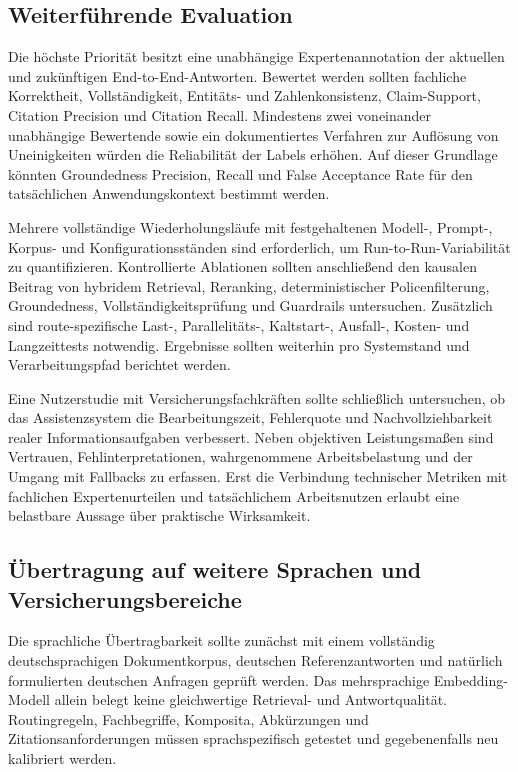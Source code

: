 \subsection{Weiterführende Evaluation}

Die höchste Priorität besitzt eine unabhängige Expertenannotation der aktuellen und zukünftigen End-to-End-Antworten. Bewertet werden sollten fachliche Korrektheit, Vollständigkeit, Entitäts- und Zahlenkonsistenz, Claim-Support, Citation Precision und Citation Recall. Mindestens zwei voneinander unabhängige Bewertende sowie ein dokumentiertes Verfahren zur Auflösung von Uneinigkeiten würden die Reliabilität der Labels erhöhen. Auf dieser Grundlage könnten Groundedness Precision, Recall und False Acceptance Rate für den tatsächlichen Anwendungskontext bestimmt werden.

Mehrere vollständige Wiederholungsläufe mit festgehaltenen Modell-, Prompt-, Korpus- und Konfigurationsständen sind erforderlich, um Run-to-Run-Variabilität zu quantifizieren. Kontrollierte Ablationen sollten anschließend den kausalen Beitrag von hybridem Retrieval, Reranking, deterministischer Policenfilterung, Groundedness, Vollständigkeitsprüfung und Guardrails untersuchen. Zusätzlich sind route-spezifische Last-, Parallelitäts-, Kaltstart-, Ausfall-, Kosten- und Langzeittests notwendig. Ergebnisse sollten weiterhin pro Systemstand und Verarbeitungspfad berichtet werden.

Eine Nutzerstudie mit Versicherungsfachkräften sollte schließlich untersuchen, ob das Assistenzsystem die Bearbeitungszeit, Fehlerquote und Nachvollziehbarkeit realer Informationsaufgaben verbessert. Neben objektiven Leistungsmaßen sind Vertrauen, Fehlinterpretationen, wahrgenommene Arbeitsbelastung und der Umgang mit Fallbacks zu erfassen. Erst die Verbindung technischer Metriken mit fachlichen Expertenurteilen und tatsächlichem Arbeitsnutzen erlaubt eine belastbare Aussage über praktische Wirksamkeit.

\subsection{Übertragung auf weitere Sprachen und Versicherungsbereiche}

Die sprachliche Übertragbarkeit sollte zunächst mit einem vollständig deutschsprachigen Dokumentkorpus, deutschen Referenzantworten und natürlich formulierten deutschen Anfragen geprüft werden. Das mehrsprachige Embedding-Modell allein belegt keine gleichwertige Retrieval- und Antwortqualität. Routingregeln, Fachbegriffe, Komposita, Abkürzungen und Zitationsanforderungen müssen sprachspezifisch getestet und gegebenenfalls neu kalibriert werden.

